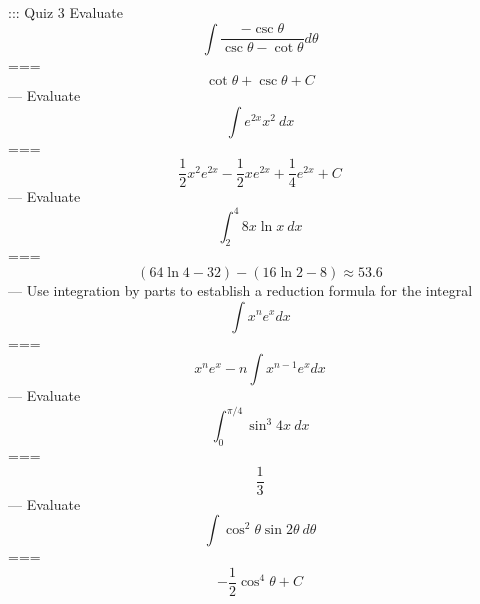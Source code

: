 ::: Quiz 3
Evaluate
\[\int\frac{-\csc\theta}{\csc\theta-\cot\theta}d\theta\]
===
\[\cot\theta+\csc\theta+C\]
---
Evaluate
\[\int e^{2x}x^2\ dx\]
===
\[\frac{1}{2}x^2e^{2x}-\frac{1}{2}xe^{2x}+\frac{1}{4}e^{2x}+C\]
---
Evaluate
\[\int_2^4 8x\ln x\ dx\]
===
\[(64\ln 4-32)-(16\ln 2-8)\approx 53.6\]
---
Use integration by parts to establish a reduction formula for the integral
\[\int x^n e^x dx\]
===
\[x^ne^x-n\int x^{n-1}e^x dx\]
---
Evaluate
\[\int_0^{\pi/4}\sin^3 4x\ dx\]
===
\[\frac{1}{3}\]
---
Evaluate
\[\int\cos^2\theta\sin 2\theta\ d\theta\]
===
\[-\frac{1}{2}\cos^4\theta+C\]
